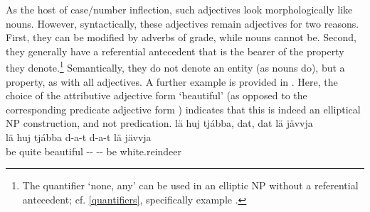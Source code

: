 As the host of case/number inflection, such adjectives look morphologically like nouns. 
However, syntactically, these adjectives remain adjectives for two reasons. First, they can be modified by adverbs of grade, while nouns cannot be. Second, they generally have a referential antecedent that is the bearer of the property they denote.\footnote{The quantifier  ‘none, any’ can be used in an elliptic NP without a referential antecedent; cf. \SEC\ref{quantifiers}, specifically example .} 
Semantically, they do not denote an entity (as nouns do), but a property, as with all adjectives. 
A further example is provided in . 
Here, the choice of the attributive adjective form  ‘beautiful’ (as opposed to the corresponding predicate adjective form ) indicates that this is indeed an elliptical NP construction, and not predication. 
\ea\label{adjNPheadEx4}
\glll	lä huj tjábba, dat, dat lä jävvja\\
	lä huj tjábba d-a-t d-a-t lä jävvja\\
	be\BS{} quite beautiful\BS{} -- -- be\BS{} white.reindeer\BS{}\\\nopagebreak
{}	
\z
{}



